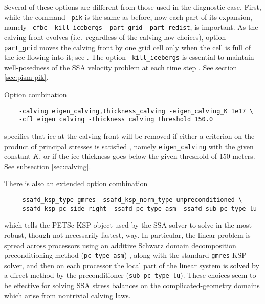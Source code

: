 Several of these options are different from those used in the diagnostic case.  First, while the command \texttt{-pik} is the same as before, now each part of its expansion, namely \texttt{-cfbc -kill_icebergs -part_grid -part_redist}, is important.  As the calving front evolves (i.e.~regardless of the calving law choices), option \texttt{-part_grid} moves the calving front by one grid cell only when the cell is full of the ice flowing into it; see \cite{Albrechtetal2011}.  The option \texttt{-kill_icebergs} is essential to maintain well-posedness of the SSA velocity problem at each time step \cite{Winkelmannetal2011}.  See section \ref{sec:pism-pik}.

Option combination
\begin{verbatim}
    -calving eigen_calving,thickness_calving -eigen_calving_K 1e17 \
    -cfl_eigen_calving -thickness_calving_threshold 150.0
\end{verbatim}%
specifies that ice at the calving front will be removed if either a criterion on the product of principal stresses is satisfied \cite{Levermannetal2012}, namely \texttt{eigen_calving} with the given constant $K$, or if the ice thickness goes below the given threshold of 150 meters.  See subsection \ref{sec:calving}.

There is also an extended option combination
\begin{verbatim}
    -ssafd_ksp_type gmres -ssafd_ksp_norm_type unpreconditioned \
    -ssafd_ksp_pc_side right -ssafd_pc_type asm -ssafd_sub_pc_type lu
\end{verbatim}%
which tells the PETSc KSP object used by the SSA solver to solve in the most robust, though not necessarily fastest, way.  In particular, the linear problem is spread across processors using an additive Schwarz domain decomposition preconditioning method (\texttt{pc_type asm}) \cite{Smithetal1996}, along with the standard \texttt{gmres} KSP solver, and then on each processor the local part of the linear system is solved by a direct method by the preconditioner (\texttt{sub_pc_type lu}).  These choices seem to be effective for solving SSA stress balances on the complicated-geometry domains which arise from nontrivial calving laws.



